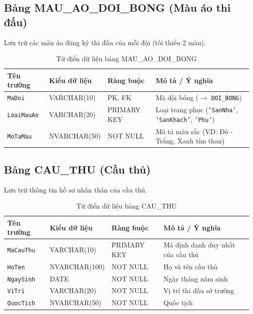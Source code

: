 \subsection{Bảng MAU\_AO\_DOI\_BONG (Màu áo thi đấu)}
Lưu trữ các màu áo đăng ký thi đấu của mỗi đội (tối thiểu 2 màu).
\begin{table}[H]
\centering
\small
\begin{tabular}{|l|l|l|p{6cm}|}
\hline
\textbf{Tên trường} & \textbf{Kiểu dữ liệu} & \textbf{Ràng buộc} & \textbf{Mô tả / Ý nghĩa} \\ \hline
\texttt{MaDoi} & VARCHAR(10) & PK, FK & Mã đội bóng ($\rightarrow$ \texttt{DOI\_BONG}) \\ \hline
\texttt{LoaiMauAo} & VARCHAR(20) & PRIMARY KEY & Loại trang phục (\texttt{'SanNha'}, \texttt{'SanKhach'}, \texttt{'Phu'}) \\ \hline
\texttt{MoTaMau} & NVARCHAR(50) & NOT NULL & Mô tả màu sắc (VD: Đỏ - Trắng, Xanh tím than) \\ \hline
\end{tabular}
\caption{Từ điển dữ liệu bảng MAU\_AO\_DOI\_BONG}
\end{table}

\subsection{Bảng CAU\_THU (Cầu thủ)}
Lưu trữ thông tin hồ sơ nhân thân của cầu thủ.
\begin{table}[H]
\centering
\small
\begin{tabular}{|l|l|l|p{6cm}|}
\hline
\textbf{Tên trường} & \textbf{Kiểu dữ liệu} & \textbf{Ràng buộc} & \textbf{Mô tả / Ý nghĩa} \\ \hline
\texttt{MaCauThu} & VARCHAR(10) & PRIMARY KEY & Mã định danh duy nhất của cầu thủ \\ \hline
\texttt{HoTen} & NVARCHAR(100) & NOT NULL & Họ và tên cầu thủ \\ \hline
\texttt{NgaySinh} & DATE & NOT NULL & Ngày tháng năm sinh \\ \hline
\texttt{ViTri} & VARCHAR(20) & NOT NULL & Vị trí thi đấu sở trường \\ \hline
\texttt{QuocTich} & NVARCHAR(50) & NOT NULL & Quốc tịch \\ \hline
\end{tabular}
\caption{Từ điển dữ liệu bảng CAU\_THU}
\end{table}

